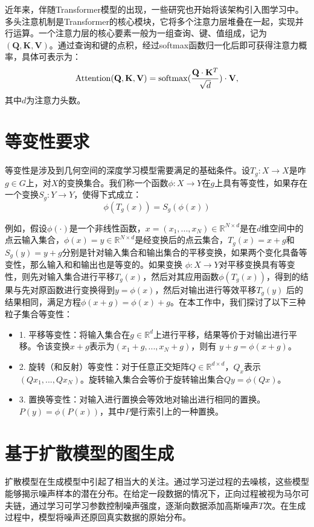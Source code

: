 近年来，伴随Transformer模型的出现，一些研究也开始将该架构引入图学习中。多头注意机制是Transformer的核心模块，它将多个注意力层堆叠在一起，实现并行运算。一个注意力层的核心要素一般为一组查询、键、值组成，记为$(\mathbf{Q}, \mathbf{K}, \mathbf{V})$。通过查询和键的点积，经过softmax函数归一化后即可获得注意力概率，具体可表示为：
\begin{eqnarray}
    {\rm Attention}(\mathbf{Q}, \mathbf{K}, \mathbf{V}) = {\rm softmax}(\frac{\mathbf{Q} \cdot \mathbf{K}^T}{\sqrt{d}}) \cdot \mathbf{V},
\end{eqnarray}
其中$d$为注意力头数。

\section{等变性要求}
等变性是涉及到几何空间的深度学习模型需要满足的基础条件。设$T_g: X \to X$是咋$g \in G$上，对$X$的变换集合。我们称一个函数$\phi: X \to Y$在$g$上具有等变性，如果存在一个变换$S_g: Y \to Y$，使得下式成立：
\begin{equation}
    \phi (T_g(x)) = S_g(\phi (x))
\end{equation}

例如，假设$\phi (\cdot)$是一个非线性函数，$x = (x_1, ..., x_N) \in \mathbb{R}^{N \times d}$是在$d$维空间中的点云输入集合，$\phi (x) = y \in \mathbb{R}^{N \times d}$是经变换后的点云集合，$T_g (x) = x + g$和$S_g(y) = y + g$分别是针对输入集合和输出集合的平移变换，如果两个变化具备等变性，那么输入和和输出也是等变的。如果变换 $\phi : X \to Y$对平移变换具有等变性，则先对输入集合进行平移$T_g(x)$，然后对其应用函数$\phi(T_g(x))$，得到的结果与先对原函数进行变换得到$y = \phi(x)$，然后对输出进行等效平移$T_g(y)$ 后的结果相同，满足方程$\phi (x+g) = \phi (x) + g$。在本工作中，我们探讨了以下三种粒子集合等变性：
\begin{itemize}
    \item 1. 平移等变性：将输入集合在$g \in \mathbb{R}^d$上进行平移，结果等价于对输出进行平移。令该变换$x + g$表示为$(x_1+g, ..., x_N + g)$，则有 $y+g = \phi (x+g)$。
    \item 2. 旋转（和反射）等变性：对于任意正交矩阵$Q \in \mathbb{R}^{d \times d}$，$Q_x$表示$(Qx_1, ..., Qx_N)$。旋转输入集合会等价于旋转输出集合$Qy = \phi(Qx)$。
    \item 3. 置换等变性：对输入进行置换会等效地对输出进行相同的置换。$P(y) = \phi(P(x))$，其中$P$是行索引上的一种置换。
\end{itemize}


\section{基于扩散模型的图生成}
扩散模型在生成模型中引起了相当大的关注。通过学习逆过程的去噪核，这些模型能够揭示噪声样本的潜在分布。在给定一段数据的情况下，正向过程被视为马尔可夫链，通过学习可学习参数控制噪声强度，逐渐向数据添加高斯噪声$T$次。在生成过程中，模型将噪声还原回真实数据的原始分布。


